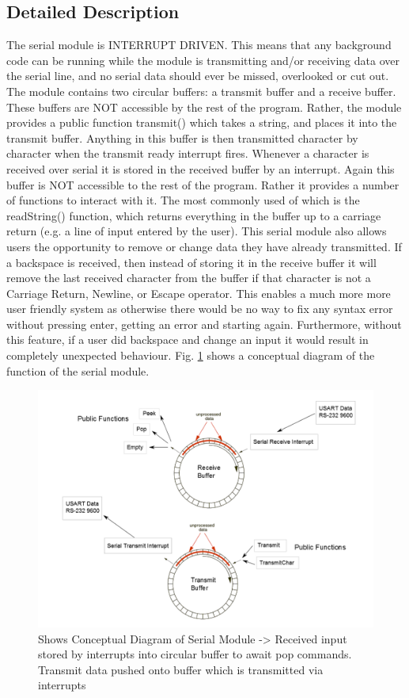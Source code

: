 \documentclass[]{report}
\begin{document}
\subsection{Detailed Description}
The serial module is INTERRUPT DRIVEN. This means that any background code can be running while the module is transmitting and/or receiving data over the serial line, and no serial data should ever be missed, overlooked or cut out. \newline
The module contains two circular buffers: a transmit buffer and a receive buffer. These buffers are NOT accessible by the rest of the program. Rather, the module provides a public function transmit() which takes a string, and places it into the transmit buffer. Anything in this buffer is then transmitted character by character when the transmit ready interrupt fires. \newline
Whenever a character is received over serial it is stored in the received buffer by an interrupt. Again this buffer is NOT accessible to the rest of the program. Rather it provides a number of functions to interact with it. The most commonly used of which is the readString() function, which returns everything in the buffer up to a carriage return (e.g. a line of input entered by the user). \newline
This serial module also allows users the opportunity to remove or change data they have already transmitted. If a backspace is received, then instead of storing it in the receive buffer it will remove the last received character from the buffer if that character is not a Carriage Return, Newline, or Escape operator. This enables a much more more user friendly system as otherwise there would be no way to fix any syntax error without pressing enter, getting an error and starting again. Furthermore, without this feature, if a user did backspace and change an input it would result in completely unexpected behaviour. \newline
Fig. \ref{fig:SerialModule} shows a conceptual diagram of the function of the serial module.

\begin{figure}
	\centering
	\includegraphics[width=0.7\linewidth]{"../Diagrams/Serial Module"}
	\caption[Serial Module]{Shows Conceptual Diagram of Serial Module -> Received input stored by interrupts into circular buffer to await pop commands. Transmit data pushed onto buffer which is transmitted via interrupts}
	\label{fig:SerialModule}
\end{figure}
\end{document}
